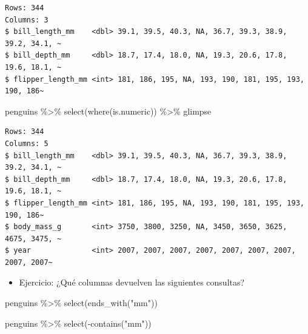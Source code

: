 \documentclass[
  letterpaper,
  DIV=11,
  numbers=noendperiod]{scrreprt}
\newenvironment{Shaded}{\begin{snugshade}}{\end{snugshade}}
\newcommand{\FunctionTok}[1]{\textcolor[rgb]{0.28,0.35,0.67}{#1}}
\newcommand{\NormalTok}[1]{\textcolor[rgb]{0.00,0.23,0.31}{#1}}
\newcommand{\SpecialCharTok}[1]{\textcolor[rgb]{0.37,0.37,0.37}{#1}}
\newcommand{\StringTok}[1]{\textcolor[rgb]{0.13,0.47,0.30}{#1}}
\providecommand{\tightlist}{%
  \setlength{\itemsep}{0pt}\setlength{\parskip}{0pt}}\usepackage{longtable,booktabs,array}
\begin{document}
\begin{verbatim}
Rows: 344
Columns: 3
$ bill_length_mm    <dbl> 39.1, 39.5, 40.3, NA, 36.7, 39.3, 38.9, 39.2, 34.1, ~
$ bill_depth_mm     <dbl> 18.7, 17.4, 18.0, NA, 19.3, 20.6, 17.8, 19.6, 18.1, ~
$ flipper_length_mm <int> 181, 186, 195, NA, 193, 190, 181, 195, 193, 190, 186~
\end{verbatim}

\begin{Shaded}
\begin{Highlighting}[]
\NormalTok{penguins }\SpecialCharTok{\%\textgreater{}\%} 
  \FunctionTok{select}\NormalTok{(}\FunctionTok{where}\NormalTok{(is.numeric)) }\SpecialCharTok{\%\textgreater{}\%} 
\NormalTok{  glimpse}
\end{Highlighting}
\end{Shaded}

\begin{verbatim}
Rows: 344
Columns: 5
$ bill_length_mm    <dbl> 39.1, 39.5, 40.3, NA, 36.7, 39.3, 38.9, 39.2, 34.1, ~
$ bill_depth_mm     <dbl> 18.7, 17.4, 18.0, NA, 19.3, 20.6, 17.8, 19.6, 18.1, ~
$ flipper_length_mm <int> 181, 186, 195, NA, 193, 190, 181, 195, 193, 190, 186~
$ body_mass_g       <int> 3750, 3800, 3250, NA, 3450, 3650, 3625, 4675, 3475, ~
$ year              <int> 2007, 2007, 2007, 2007, 2007, 2007, 2007, 2007, 2007~
\end{verbatim}

\begin{itemize}
\tightlist
\item
  {Ejercicio}: ¿Qué columnas devuelven las siguientes consultas?
\end{itemize}

\begin{Shaded}
\begin{Highlighting}[]
\NormalTok{penguins }\SpecialCharTok{\%\textgreater{}\%} 
  \FunctionTok{select}\NormalTok{(}\FunctionTok{ends\_with}\NormalTok{(}\StringTok{"mm"}\NormalTok{))}
\end{Highlighting}
\end{Shaded}

\begin{Shaded}
\begin{Highlighting}[]
\NormalTok{penguins }\SpecialCharTok{\%\textgreater{}\%} 
  \FunctionTok{select}\NormalTok{(}\SpecialCharTok{{-}}\FunctionTok{contains}\NormalTok{(}\StringTok{"mm"}\NormalTok{))}
\end{Highlighting}
\end{Shaded}
\end{document}
